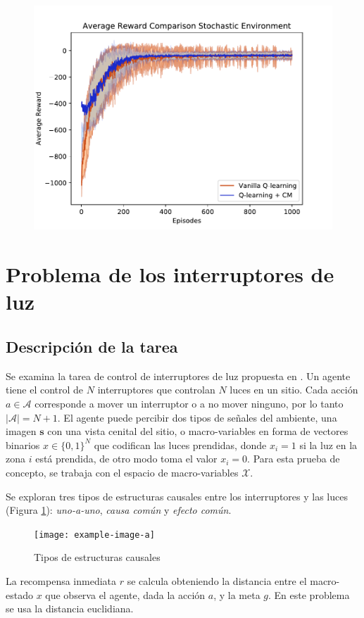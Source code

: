 \begin{figure}[H]
    \centering
    \includegraphics[scale=0.5]{Chapter5/Figs/comparisonStochastic.pdf}
\end{figure}

\section{Problema de los interruptores de luz}

\subsection{Descripción de la tarea}
Se examina la tarea de control de interruptores de luz propuesta en \cite{nair2019causal}. Un agente tiene el control
de $N$ interruptores que controlan $N$ luces en un sitio.
Cada acción $a\in \mathcal{A}$ corresponde a mover un interruptor o 
a no mover ninguno, por lo tanto $|\mathcal{A}| = N + 1$.
El agente puede percibir dos tipos de señales del ambiente,
una imagen $\mathbf{s}$ con una vista cenital del sitio, o macro-variables en forma de vectores binarios $x \in \{0,1\}^N$ que codifican las luces prendidas, donde
$x_i = 1$ si la luz en la zona $i$ está prendida, de otro modo 
toma el valor $x_i = 0$.
Para esta prueba de concepto, se trabaja con el espacio
de macro-variables $\mathcal{X}$.

Se exploran tres tipos de estructuras causales entre los
interruptores y las luces (Figura \ref{fig:struc}): \textit{uno-a-uno},
\textit{causa común} y \textit{efecto común}.

\begin{figure}[H]
    \centering
    \texttt{[image: example-image-a]}
    \caption{Tipos de estructuras causales}
    \label{fig:struc}
\end{figure}
La recompensa inmediata $r$ se calcula obteniendo la distancia entre
el macro-estado $x$ que observa el agente, dada la acción $a$, y la meta $g$. En este problema se usa la distancia euclidiana.

